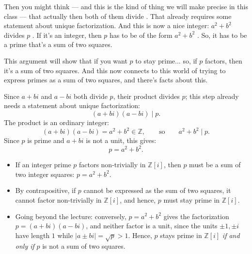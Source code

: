 \begin{speech}[00:05:18 - 00:06:08]
Then you might think --- and this is the kind of thing we will make precise in this class --- that actually then both of them divide . That already requires some statement about unique factorization. And this is now a nice integer: $a^2 + b^2$ divides $p$ . If it's an integer, then $p$ has to be of the form $a^2 + b^2$ . So, it has to be a prime that's a sum of two squares.

This argument will show that if you want $p$ to stay prime... so, if $p$ factors, then it's a sum of two squares. And this now connects to this world of trying to express primes as a sum of two squares, and there's facts about this.
\end{speech}

\begin{content}
Since $a + bi$ and $a - bi$ both divide $p$, their product divides $p$; this step already needs a statement about unique factorization:
\[
(a + bi)(a - bi) \mid p.
\]
The product is an ordinary integer:
\[
(a + bi)(a - bi) = a^2 + b^2 \in \mathbb{Z}, \qquad \text{so} \qquad a^2 + b^2 \mid p.
\]
Since $p$ is prime and $a + bi$ is not a unit, this gives:
\begin{equation}\label{eq:sum-of-squares-condition}
p = a^2 + b^2.
\end{equation}

\begin{steps}
\begin{itemize}
    \item If an integer prime $p$ factors non-trivially in $\mathbb{Z}[i]$, then $p$ must be a sum of two integer squares: $p = a^2 + b^2$.
    \item By contrapositive, if $p$ cannot be expressed as the sum of two squares, it cannot factor non-trivially in $\mathbb{Z}[i]$, and hence, $p$ must stay prime in $\mathbb{Z}[i]$.
    \item Going beyond the lecture: conversely, $p = a^2 + b^2$ gives the factorization $p = (a + bi)(a - bi)$, and neither factor is a unit, since the units $\pm 1, \pm i$ have length $1$ while $|a \pm bi| = \sqrt{p} > 1$. Hence, $p$ stays prime in $\mathbb{Z}[i]$ \emph{if and only if} $p$ is not a sum of two squares.
\end{itemize}
\end{steps}
\end{content}

